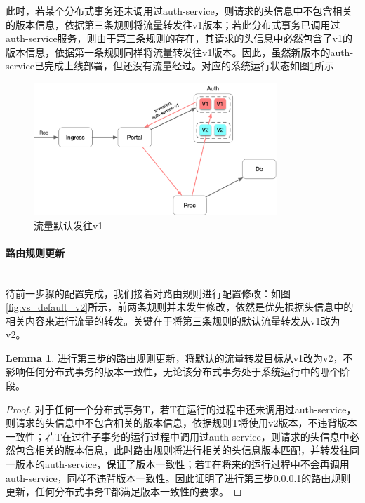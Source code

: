 \documentclass[a4paper]{article}
\theoremstyle{definition}
\newtheorem{lemma}{Lemma}
\begin{document}
此时，若某个分布式事务还未调用过auth-service，则请求的头信息中不包含相关的版本信息，依据第三条规则将流量转发往v1版本；若此分布式事务已调用过auth-service服务，则由于第三条规则的存在，其请求的头信息中必然包含了v1的版本信息，依据第一条规则同样将流量转发往v1版本。因此，虽然新版本的auth-service已完成上线部署，但还没有流量经过。对应的系统运行状态如图\ref{fig:traffic_default_v1}所示
\begin{figure}[!ht]
 \centering
 \includegraphics[height=5cm]{images/traffic_default_v1.png}
 \caption{流量默认发往v1}
 \label{fig:traffic_default_v1}
\end{figure}

\paragraph{路由规则更新}\label{section:update_route}\mbox{}\\

待前一步骤的配置完成，我们接着对路由规则进行配置修改：如图\ref{fig:vs_default_v2}所示，前两条规则并未发生修改，依然是优先根据头信息中的相关内容来进行流量的转发。关键在于将第三条规则的默认流量转发从v1改为v2。

\begin{lemma}
进行第三步的路由规则更新，将默认的流量转发目标从v1改为v2，不影响任何分布式事务的版本一致性，无论该分布式事务处于系统运行中的哪个阶段。
\end{lemma}

\begin{proof}
对于任何一个分布式事务T，若T在运行的过程中还未调用过auth-service，则请求的头信息中不包含相关的版本信息，依据规则T将使用v2版本，不违背版本一致性；若T在过往子事务的运行过程中调用过auth-service，则请求的头信息中必然包含相关的版本信息，此时路由规则将进行相关的头信息版本匹配，并转发往同一版本的auth-service，保证了版本一致性；若T在将来的运行过程中不会再调用auth-service，同样不违背版本一致性。因此证明了进行第三步\ref{section:update_route}的路由规则更新，任何分布式事务T都满足版本一致性的要求。
\end{proof}
\end{document}
